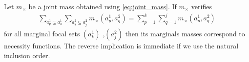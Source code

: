 \begin{proposition}
    Let $m_\times$ be a joint mass obtained using \eqref{eq:joint_mass}. If $m_\times$ verifies
    \begin{align*}
        \sum_{a^1_p\subseteq a_k^1}\sum_{a^2_q\subseteq a_j^2}m_\times(a^1_p, a^2_q) = \sum_{p=1}^k\sum_{q=1}^j m_\times(a^1_p, a^2_q)
    \end{align*}
    for all marginal focal sets $(a^1_k)$ ,$(a^2_j)$ then its marginals masses correspond to necessity functions. The reverse implication is immediate if we use the natural inclusion order.
\end{proposition}
